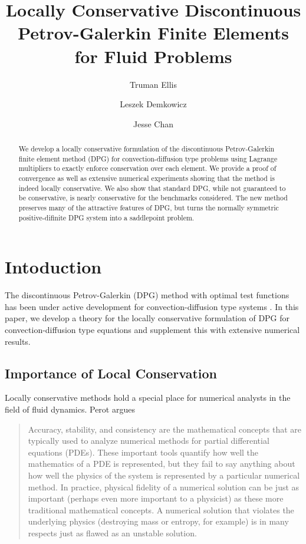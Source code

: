 \documentclass[letterpaper]{article}
\title{Locally Conservative Discontinuous Petrov-Galerkin Finite Elements for
Fluid Problems}
\author{Truman Ellis}
\author{Leszek Demkowicz}
\author{Jesse Chan}
\affil{Institute for Computational Engineering and Sciences,\\
The University of Texas at Austin, \\
Austin, TX 78712}
\date{}
\begin{document}
\maketitle

\begin{abstract}
We develop a locally conservative formulation of the discontinuous
Petrov-Galerkin finite element method (DPG) for convection-diffusion type
problems using Lagrange multipliers to exactly enforce conservation over each
element. We provide a proof of convergence as well as extensive numerical
experiments showing that the method is indeed locally conservative. We also
show that standard DPG, while not guaranteed to be conservative, is nearly
conservative for the benchmarks considered. The new method preserves many of
the attractive features of DPG, but turns the normally symmetric
positive-difinite DPG system into a saddlepoint problem.
\end{abstract}

\section{Intoduction}
The discontinuous Petrov-Galerkin (DPG) method with optimal test functions has
been under active development for convection-diffusion type systems
\cite{DPG1, DPG2, DPG3, DPG5, DemkowiczHeuer, ChanHeuerThanhDemkowicz2012,
MoroNguyenPeraire11}. In this paper, we develop a theory for the locally conservative
formulation of DPG for convection-diffusion type equations and supplement this
with extensive numerical results.

\subsection{Importance of Local Conservation}
Locally conservative methods hold a special place for numerical analysts in
the field of fluid dynamics.
Perot\cite{Perot2011} argues
\begin{quote}
Accuracy, stability, and consistency are the mathematical concepts that are
typically used to analyze numerical methods for partial differential equations
(PDEs). These important tools quantify how well the mathematics of a PDE is
represented, but they fail to say anything about how well the physics of the
system is represented by a particular numerical method. In practice, physical
fidelity of a numerical solution can be just as important (perhaps even more
important to a physicist) as these more traditional mathematical concepts. A
numerical solution that violates the underlying physics (destroying mass or
entropy, for example) is in many respects just as flawed as an unstable
solution.
\end{quote}
\end{document}
